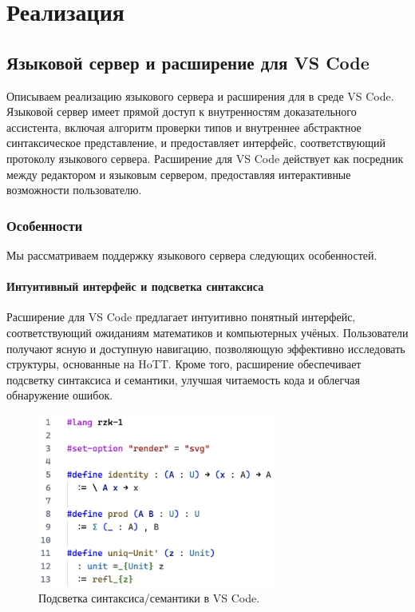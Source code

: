 \chapter{Реализация}
\label{chap:impl}

\section{Языковой сервер \Rzk{} и расширение для VS Code}

Описываем реализацию языкового сервера и расширения для \Rzk{} в среде VS Code.
Языковой сервер имеет прямой доступ к внутренностям доказательного ассистента,
включая алгоритм проверки типов и внутреннее абстрактное синтаксическое представление,
и предоставляет интерфейс, соответствующий протоколу языкового сервера.
Расширение для VS Code действует как посредник между редактором и языковым сервером,
предоставляя интерактивные возможности пользователю.

\subsection{Особенности}

Мы рассматриваем поддержку языкового сервера следующих особенностей.

\subsubsection{Интуитивный интерфейс и подсветка синтаксиса}

Расширение для VS Code предлагает интуитивно понятный интерфейс,
соответствующий ожиданиям математиков и компьютерных учёных.
Пользователи получают ясную и доступную навигацию,
позволяющую эффективно исследовать структуры, основанные на HoTT.
Кроме того, расширение обеспечивает подсветку синтаксиса и семантики,
улучшая читаемость кода и облегчая обнаружение ошибок.

\begin{figure}[ht]
  \centering
  \includegraphics[width=0.7\textwidth]{figs/syntax-highlighting.png}
  \caption{Подсветка синтаксиса/семантики в VS Code.}
  \label{figure:syntax-highlighting}
\end{figure}

